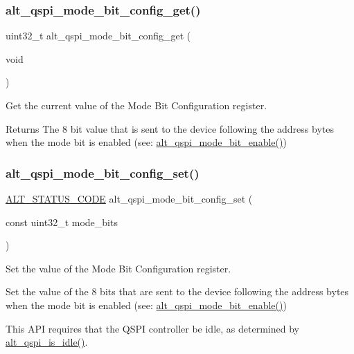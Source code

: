 \subsubsection{\texorpdfstring{alt\_qspi\_mode\_bit\_config\_get()}{alt\_qspi\_mode\_bit\_config\_get()}}
{\footnotesize\ttfamily uint32\+\_\+t alt\+\_\+qspi\+\_\+mode\+\_\+bit\+\_\+config\+\_\+get (\begin{DoxyParamCaption}\item[{void}]{ }\end{DoxyParamCaption})}

Get the current value of the Mode Bit Configuration register.

\begin{DoxyReturn}{Returns}
The 8 bit value that is sent to the device following the address bytes when the mode bit is enabled (see\+: \mbox{\hyperlink{group__ALT__QSPI__DEV__CFG_gac4eb6995a032a293aa3ff09739344712}{alt\+\_\+qspi\+\_\+mode\+\_\+bit\+\_\+enable()}}) 
\end{DoxyReturn}
\mbox{\label{group__ALT__QSPI__DEV__CFG_gada3ca0ace7fbbf8bd1ea1ce2ad9dada0}} 
\subsubsection{\texorpdfstring{alt\_qspi\_mode\_bit\_config\_set()}{alt\_qspi\_mode\_bit\_config\_set()}}
{\footnotesize\ttfamily \mbox{\hyperlink{hwlib_8h_abdb0d369f069723ca55d6c94bcaaaa12}{A\+L\+T\+\_\+\+S\+T\+A\+T\+U\+S\+\_\+\+C\+O\+DE}} alt\+\_\+qspi\+\_\+mode\+\_\+bit\+\_\+config\+\_\+set (\begin{DoxyParamCaption}\item[{const uint32\+\_\+t}]{mode\+\_\+bits }\end{DoxyParamCaption})}

Set the value of the Mode Bit Configuration register.

Set the value of the 8 bits that are sent to the device following the address bytes when the mode bit is enabled (see\+: \mbox{\hyperlink{group__ALT__QSPI__DEV__CFG_gac4eb6995a032a293aa3ff09739344712}{alt\+\_\+qspi\+\_\+mode\+\_\+bit\+\_\+enable()}})

This A\+PI requires that the Q\+S\+PI controller be idle, as determined by \mbox{\hyperlink{group__ALT__QSPI__CSR_gaeaa7e762d8b79b1989385c978174b7b8}{alt\+\_\+qspi\+\_\+is\+\_\+idle()}}.


